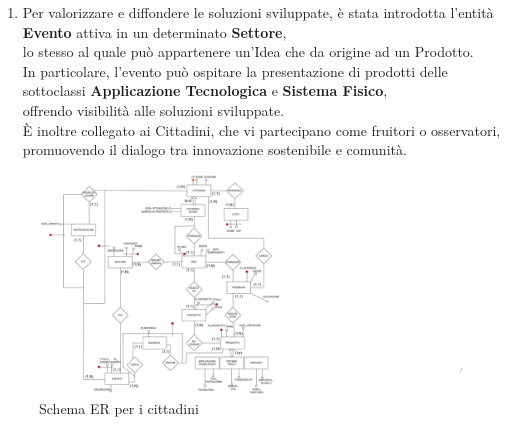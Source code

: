 \documentclass{article}
\begin{document}
\begin{par}
\begin{enumerate}
        \item Per valorizzare e diffondere le soluzioni sviluppate, è stata introdotta l’entità \textbf{Evento} attiva in un determinato \textbf{Settore},\\
        lo stesso al quale può appartenere un’Idea che da origine ad un Prodotto.\\
        In particolare, l’evento può ospitare la presentazione di prodotti delle sottoclassi \textbf{Applicazione Tecnologica} e \textbf{Sistema Fisico},\\
        offrendo visibilità alle soluzioni sviluppate.\\
        È inoltre collegato ai Cittadini, che vi partecipano come fruitori o osservatori, promuovendo il dialogo tra innovazione sostenibile e comunità.
    \end{enumerate}
    \end{par}

    \begin{figure}[H]
        
        \hspace{4cm}
        \includegraphics[width=13.7cm]{images/CITTADINI_COMPLETO.drawio.png}
        \caption{Schema ER per i cittadini}
        \label{fig:schema-sostenibilita4}
    \end{figure}
    
\newpage
\end{document}
